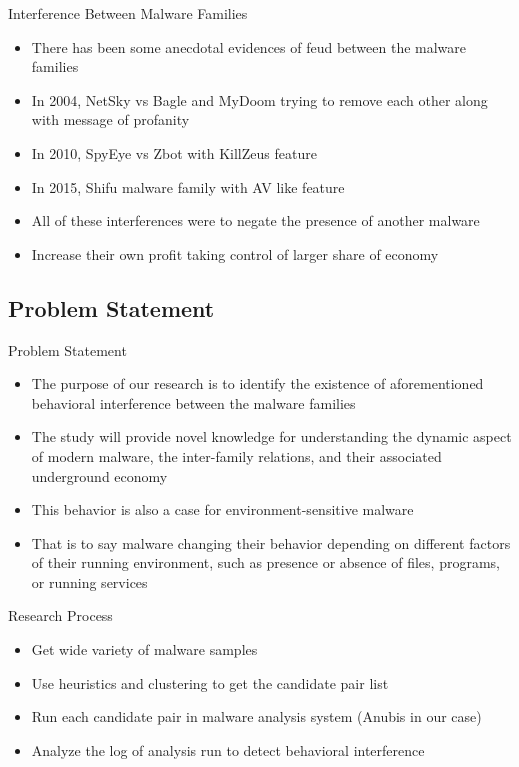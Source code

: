 \documentclass[]{beamer}
\begin{document}
\begin{frame}[t]{Interference Between Malware Families}
  \begin{itemize}
    \item There has been some anecdotal evidences of feud between the malware families
    \item In 2004, NetSky vs Bagle and MyDoom trying to remove each other along with message of profanity
    \item In 2010, SpyEye vs Zbot with KillZeus feature
    \item In 2015, Shifu malware family with AV like feature
    \item All of these interferences were to negate the presence of another malware
    \item Increase their own profit taking control of larger share of economy
  \end{itemize}
\end{frame}
\subsection{Problem Statement}
\label{sub:Problem Statement}
\begin{frame}[t]{Problem Statement}
\begin{itemize}
  \item The purpose of our research is to identify the existence of aforementioned behavioral interference between the malware families
  \item The study will provide novel knowledge for understanding the dynamic aspect of modern malware, the inter-family relations, and their associated underground economy
  \item This behavior is also a case for environment-sensitive malware
  \item That is to say malware changing their behavior depending on different factors of their running environment, such as presence or absence of files, programs, or running services
\end{itemize}
\end{frame}
\begin{frame}[t]{Research Process}
\begin{itemize}
\item Get wide variety of malware samples
\item Use heuristics and clustering to get the candidate pair list
\item Run each candidate pair in malware analysis system (Anubis in our case)
\item Analyze the log of analysis run to detect behavioral interference
\end{itemize}
\begin{figure}[h]
    \centering
    \def\svgwidth{\columnwidth}
    \scalebox{0.5}{}
\end{figure}
\end{frame}
\end{document}
